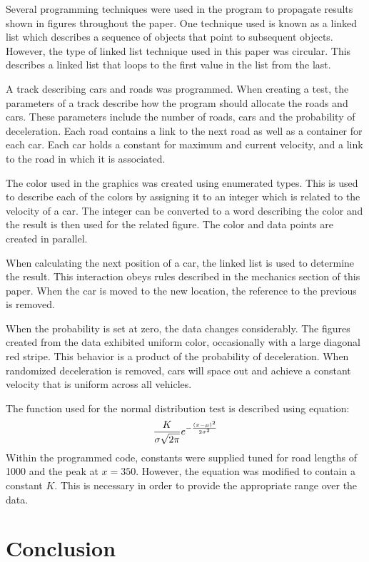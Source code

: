 \documentclass[12pt]{extarticle}
\begin{document}
Several programming techniques were used in the program to propagate results shown in figures throughout the paper. One technique used is known as a linked list\cite{linkedlist} which describes a sequence of objects that point to subsequent objects. However, the type of linked list technique used in this paper was circular. This describes a linked list that loops to the first value in the list from the last. 

A track describing cars and roads was programmed. When creating a test, the parameters of a track describe how the program should allocate the roads and cars. These parameters include the number of roads, cars and the probability of deceleration. Each road contains a link to the next road as well as a container for each car. Each car holds a constant for maximum and current velocity, and a link to the road in which it is associated.

The color used in the graphics was created using enumerated types\cite{Enumerated}. This is used to describe each of the colors by assigning it to an integer which is related to the velocity of a car. The integer can be converted to a word describing the color and the result is then used for the related figure. The color and data points are created in parallel.

When calculating the next position of a car, the linked list is used to determine the result. This interaction obeys rules described in the mechanics section of this paper. When the car is moved to the new location, the reference to the previous is removed.

When the probability is set at zero, the data changes considerably. The figures created from the data exhibited uniform color, occasionally with a large diagonal red stripe. This behavior is a product of the probability of deceleration. When randomized deceleration is removed, cars will space out and achieve a constant velocity that is uniform across all vehicles.


The function used for the normal distribution\cite{ND} test is described using equation:
\begin{align}
\notag
\frac{K}{\sigma\sqrt{2\pi}}e^{-\frac{(x-\mu)^2}{2\sigma^2}}
\end{align}
Within the programmed code, constants were supplied tuned for road lengths of 1000 and the peak at $x=350$. However, the equation was modified to contain a constant $K$. This is necessary in order to provide the appropriate range over the data.

\section{Conclusion}
\end{document}
